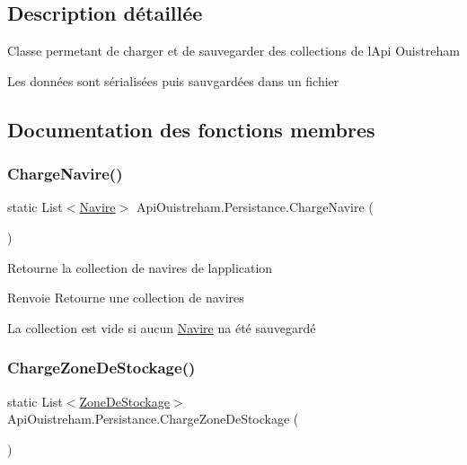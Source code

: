 \subsection{Description détaillée}
Classe permetant de charger et de sauvegarder des collections de l\textquotesingle{}Api Ouistreham 

Les données sont sérialisées puis sauvgardées dans un fichier

\subsection{Documentation des fonctions membres}
\mbox{\label{class_api_ouistreham_1_1_persistance_a2df452ff8706e4661261fbd6bb78f467}} 
\subsubsection{\texorpdfstring{Charge\+Navire()}{ChargeNavire()}}
{\footnotesize\ttfamily static List$<$\hyperlink{class_api_ouistreham_1_1_navire}{Navire}$>$ Api\+Ouistreham.\+Persistance.\+Charge\+Navire (\begin{DoxyParamCaption}{ }\end{DoxyParamCaption})\hspace{0.3cm}{\ttfamily [static]}}



Retourne la collection de navires de l\textquotesingle{}application 

\begin{DoxyReturn}{Renvoie}
Retourne une collection de navires
\end{DoxyReturn}


La collection est vide si aucun \hyperlink{class_api_ouistreham_1_1_navire}{Navire} n\textquotesingle{}a été sauvegardé\mbox{\label{class_api_ouistreham_1_1_persistance_afa6630c405be79ae6d95adcbf64fe6ed}} 
\subsubsection{\texorpdfstring{Charge\+Zone\+De\+Stockage()}{ChargeZoneDeStockage()}}
{\footnotesize\ttfamily static List$<$\hyperlink{class_api_ouistreham_1_1_zone_de_stockage}{Zone\+De\+Stockage}$>$ Api\+Ouistreham.\+Persistance.\+Charge\+Zone\+De\+Stockage (\begin{DoxyParamCaption}{ }\end{DoxyParamCaption})\hspace{0.3cm}{\ttfamily [static]}}



